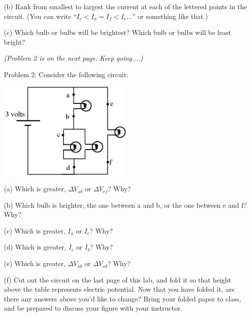 (b) Rank from smallest to largest the current at each of the lettered points in the circuit.   (You can write ``$I_c<I_a=I_f<I_e…$'' or something like that.) 
\answerspace{0.7 in}

(c) Which bulb or bulbs will be brightest?  Which bulb or bulbs will be least bright?
\answerspace{1.7 in}

\textit{(Problem 2 is on the next page.  Keep going....)}

\pagebreak[2]
Problem 2: Consider the following circuit:

\begin{center}
\includegraphics[width=0.5\textwidth]{electric_circuits/circ_diag7.eps}
\end{center}
\vspace{-0.1in}

(a) Which is greater, $\Delta V_{ab}$ or  $\Delta V_{ef}$?  Why?
\vspace{0.6 in}

(b) Which bulb is brighter, the one between a and b, or the one between e and f?  Why?
\vspace{0.6 in}

(c) Which is greater, $I_a$ or $I_e$?  Why?
\vspace{0.6 in}

(d) Which is greater, $I_c$ or $I_b$? Why?
\vspace{0.6 in}

(e) Which is greater, $\Delta V_{ab}$ or  $\Delta V_{cd}$? Why?
\vspace{0.6 in}

(f) Cut out the circuit on the last page of this lab, and fold it so that height above the table represents electric potential.  Now that you have folded it, are there any answers above you’d like to change?  Bring your folded paper to class, and be prepared to discuss your figure with your instructor.
\vspace{0.6 in}

